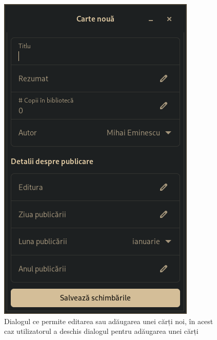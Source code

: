\documentclass{article}
\begin{document}
    \begin{figure}[H]
        \includegraphics[width=0.5\linewidth]{New-Book}
        \centering
        \caption{Dialogul ce permite editarea sau adăugarea unei cărți noi, în acest caz utilizatorul a deschis dialogul pentru adăugarea unei cărți}
    \end{figure}
\end{document}
